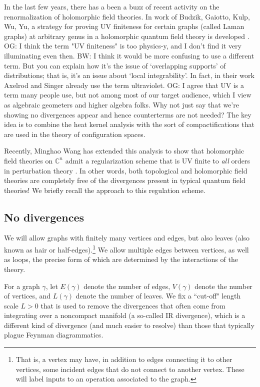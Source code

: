 \documentclass[11pt]{amsart}
\def\C{{\mathbb{C}}}
\def\brian#1{{\textcolor{blue!75!red}{BW: {#1}}}}
\def\owen#1{{\textcolor{violet!50!black}{OG: {#1}}}}
\begin{document}
In the last few years,
there has a been a buzz of recent activity on the renormalization of holomorphic field theories.
In work of Budzik, Gaiotto, Kulp, Wu, Yu, a strategy for proving UV finiteness for certain graphs (called Laman graphs) at arbitrary genus in a holomorphic quantum field theory is developed \cite{BGKWY}.
\owen{I think the term "UV finiteness" is too physics-y, and I don't find it very illuminating even then.}
\brian{I think it would be more confusing to use a different term. But you can explain how it's the issue of `overlapping supports' of distributions; that is, it's an issue about `local integrability'. In fact, in their work Axelrod and Singer already use the term ultraviolet.}
\owen{I agree that UV is a term many people use, but not among most of our target audience, which I view as algebraic geometers and higher algebra folks. Why not just say that we're showing no divergences appear and hence counterterms are not needed?}
The key idea is to combine the heat kernel analysis with the sort of compactifications that are used in the theory of configuration spaces.

Recently, Minghao Wang has extended this analysis to show that holomorphic field theories on $\C^n$ admit a regularization scheme that is UV finite to \textit{all} orders in perturbation theory \cite{Wang}.
In other words, both topological and holomorphic field theories are completely free of the divergences present in typical quantum field theories!
We briefly recall the approach to this regulation scheme.

\subsection{No divergences}

We will allow graphs with finitely many vertices and edges, 
but also leaves (also known as hair or half-edges).\footnote{That is, a vertex may have, in addition to edges connecting it to other vertices, some incident edges that do not connect to another vertex. 
These will label inputs to an operation associated to the graph.}
We allow multiple edges between vertices, as well as loops, the precise form of which are determined by the interactions of the theory.

For a graph $\gamma$, let $E(\gamma)$ denote the number of edges,
$V(\gamma)$ denote the number of vertices,
and $L(\gamma)$ denote the number of leaves.
We fix a ``cut-off" length scale $L > 0$ that is used to remove the divergences that often come from integrating over a noncompact manifold (a so-called IR divergence), 
which is a different kind of divergence (and much easier to resolve) than those that typically plague Feynman diagrammatics.
\end{document}
